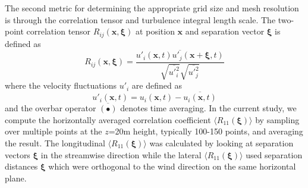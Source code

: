The second metric for determining the appropriate grid size and mesh
resolution is through the correlation tensor and turbulence integral
length scale.  The two-point correlation tensor
$R_{ij}(\mathbf{x},\boldsymbol{\xi})$ at position $\mathbf{x}$ and
separation vector $\boldsymbol{\xi}$ is defined as
\begin{equation}
  \label{eq:Rij}
  R_{ij}({\mathbf x},\boldsymbol{\xi}) =
  \frac{\overline{ {u'_i(\mathbf{x}, t) u'_j(\mathbf{x}+\boldsymbol{\xi},t)} }}
       { \sqrt{\overline{ u'^2_i }} \sqrt{\overline{ u'^2_j}} }
\end{equation}
where the velocity fluctuations $u'_i$ are defined as
\begin{equation}
  u'_i(\mathbf{x},t) = u_i(\mathbf{x},t) - \overline{ u_i(\mathbf{x},t) }
\end{equation}
and the overbar operator $\overline{(\bullet)}$ denotes time
averaging.  In the current study, we compute the horizontally averaged
correlation coefficient $\langle R_{11}(\boldsymbol{\xi})\rangle$ by
sampling over multiple points at the $z$=20m height, typically 100-150
points, and averaging the result.  The longitudinal $\langle
R_{11}(\boldsymbol{\xi})\rangle$ was calculated by looking at
separation vectors $\boldsymbol{\xi}$ in the streamwise direction
while the lateral $\langle R_{11}(\boldsymbol{\xi})\rangle$ used
separation distances $\boldsymbol{\xi}$ which were orthogonal to the
wind direction on the same horizontal plane.

